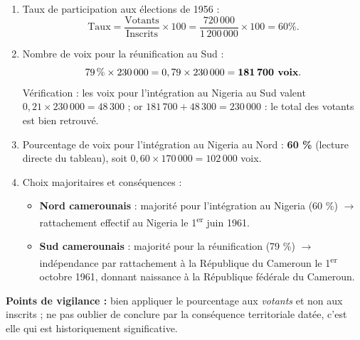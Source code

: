 \documentclass[11pt]{article}
\begin{document}
\begin{corrige}
\begin{enumerate}
\item Taux de participation aux élections de 1956 :
\[ \text{Taux} = \frac{\text{Votants}}{\text{Inscrits}} \times 100 = \frac{720\,000}{1\,200\,000} \times 100 = 60 \%. \]
\item Nombre de voix pour la réunification au Sud :
\[ 79\,\% \times 230\,000 = 0,79 \times 230\,000 = \textbf{181\,700 voix}. \]
Vérification : les voix pour l'intégration au Nigeria au Sud valent $0,21 \times 230\,000 = 48\,300$ ; or $181\,700 + 48\,300 = 230\,000$ : le total des votants est bien retrouvé.
\item Pourcentage de voix pour l'intégration au Nigeria au Nord : \textbf{60 \%} (lecture directe du tableau), soit $0,60 \times 170\,000 = 102\,000$ voix.
\item Choix majoritaires et conséquences :
\begin{itemize}
\item \textbf{Nord camerounais} : majorité pour l'intégration au Nigeria (60 \%) $\rightarrow$ rattachement effectif au Nigeria le 1\textsuperscript{er} juin 1961.
\item \textbf{Sud camerounais} : majorité pour la réunification (79 \%) $\rightarrow$ indépendance par rattachement à la République du Cameroun le 1\textsuperscript{er} octobre 1961, donnant naissance à la République fédérale du Cameroun.
\end{itemize}
\end{enumerate}
\textbf{Points de vigilance :} bien appliquer le pourcentage aux \emph{votants} et non aux inscrits ; ne pas oublier de conclure par la conséquence territoriale datée, c'est elle qui est historiquement significative.
\end{corrige}
\end{document}
